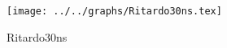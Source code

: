 \begin{figure}[h] \centering \texttt{[image: ../../graphs/Ritardo30ns.tex]}\caption{Ritardo30ns}\label{gr:Ritardo30ns} \end{figure}
